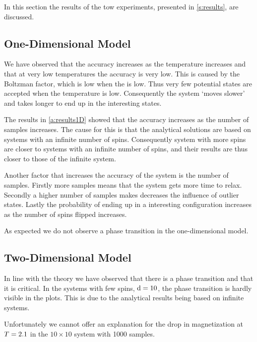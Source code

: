 In this section the results of the tow experiments, presented in \cref{s:results}, are discussed.

\subsection{One-Dimensional Model}
	
	We have observed that the accuracy increases as the temperature increases and that at very low temperatures the accuracy is very low. This is caused by the Boltzman factor, which is low when the \temperature is low. Thus very few potential states are accepted when the temperature is low. Consequently the system `moves slower' and takes longer to end up in the interesting states.
	
	The results in \cref{a:results1D} showed that the accuracy increases as the number of samples increases. The cause for this is that the analytical solutions are based on systems with an infinite number of spins. Consequently system with more spins are closer to systems with an infinite number of spins, and their results are thus closer to those of the infinite system. 

	Another factor that increases the accuracy of the system is the number of samples. Firstly more samples means that the system gets more time to relax. Secondly a higher number of samples makes decreases the influence of outlier states. Lastly the probability of ending up in a interesting configuration increases as the number of spins flipped increases.

	As expected we do not observe a phase transition in the one-dimensional model. 

\subsection{Two-Dimensional Model}
	In line with the theory we have observed that there is a phase transition and that it is critical. In the systems with few spins, $\mathrm{d} = 10$, the phase transition is hardly visible in the plots. This is due to the analytical results being based on infinite systems. 

	Unfortunately we cannot offer an explanation for the drop in magnetization at $T = 2.1$ in the $10 \times 10$ system with 1000 samples.